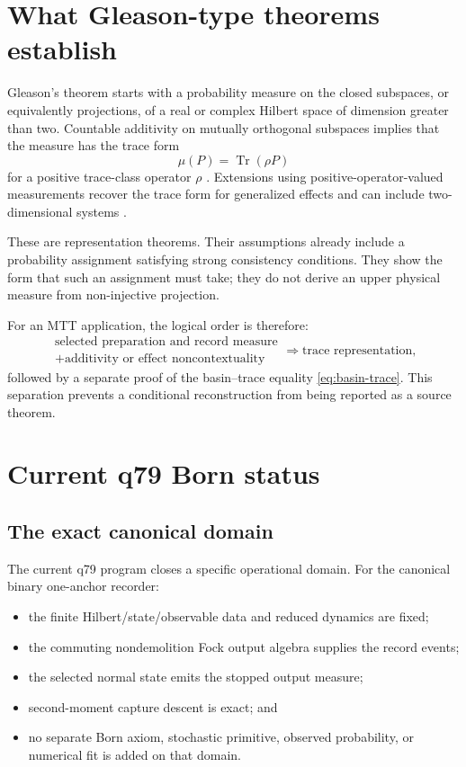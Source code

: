 \documentclass[11pt]{article}
\newcommand{\Tr}{\operatorname{Tr}}
\begin{document}
\section{What Gleason-type theorems establish}

Gleason's theorem starts with a probability measure on the closed subspaces, or
equivalently projections, of a real or complex Hilbert space of dimension
greater than two. Countable additivity on mutually orthogonal subspaces implies
that the measure has the trace form
\[
\mu(P)=\Tr(\rho P)
\]
for a positive trace-class operator \(\rho\) \cite{Gleason1957}. Extensions
using positive-operator-valued measurements recover the trace form for
generalized effects and can include two-dimensional systems
\cite{CavesEtAl2004}.

These are representation theorems. Their assumptions already include a
probability assignment satisfying strong consistency conditions. They show the
form that such an assignment must take; they do not derive an upper physical
measure from non-injective projection.

For an MTT application, the logical order is therefore:
\[
\begin{gathered}
\text{selected preparation and record measure}\\
+\text{additivity or effect noncontextuality}
\end{gathered}
\Longrightarrow
\text{trace representation},
\]
followed by a separate proof of the basin--trace equality
\eqref{eq:basin-trace}. This separation prevents a conditional reconstruction
from being reported as a source theorem.

\section{Current q79 Born status}

\subsection{The exact canonical domain}

The current q79 program closes a specific operational domain. For the canonical
binary one-anchor recorder:
\begin{itemize}
\item the finite Hilbert/state/observable data and reduced dynamics are fixed;
\item the commuting nondemolition Fock output algebra supplies the record
events;
\item the selected normal state emits the stopped output measure;
\item second-moment capture descent is exact; and
\item no separate Born axiom, stochastic primitive, observed probability, or
numerical fit is added on that domain.
\end{itemize}
\end{document}
